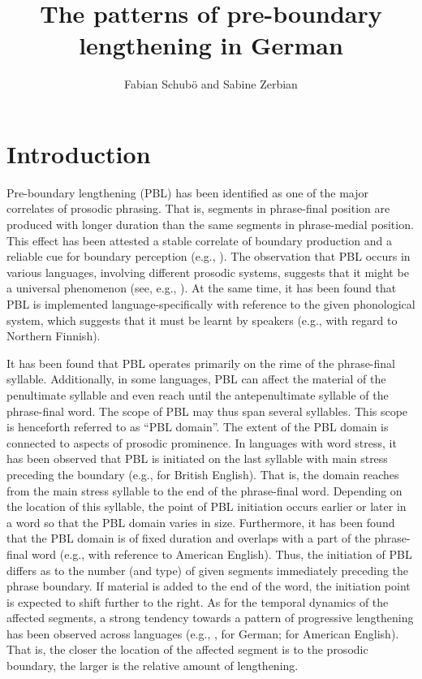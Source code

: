 \documentclass[output=paper]{langscibook}
\author{Fabian Schubö\orcid{0000-0002-9956-2438}\affiliation{University of Stuttgart} 
and Sabine Zerbian\orcid{0000-0002-4631-369X}\affiliation{University of Stuttgart}}
\title[Pre-boundary lengthening in German]{The patterns of pre-boundary lengthening in German}
\begin{document}
\maketitle

\section{Introduction}
Pre-boundary lengthening (PBL) has been identified as one of the major correlates of prosodic phrasing. That is, segments in phrase-final position are produced with longer duration than the same segments in phrase-medial position. This effect has been attested a stable correlate of boundary production and a reliable cue for boundary perception (e.g., \citealt{PetroneEtal2017}). The observation that PBL occurs in various languages, involving different prosodic systems, suggests that it might be a universal phenomenon (see, e.g., \citealt{Vaissiere83}). At the same time, it has been found that PBL is implemented language-specifically with reference to the given phonological system, which suggests that it must be learnt by speakers (e.g., \citealt{NakaiEtal2009} with regard to Northern Finnish).

It has been found that PBL operates primarily on the rime of the phrase-final syllable. Additionally, in some languages, PBL can affect the material of the penultimate syllable and even reach until the antepenultimate syllable of the phrase-final word. The scope of PBL may thus span several syllables. This scope is henceforth referred to as “PBL domain”. The extent of the PBL domain is connected to aspects of prosodic prominence. In languages with word stress, it has been observed that PBL is initiated on the last syllable with main stress preceding the boundary (e.g., \citealt{White2002} for British English). That is, the domain reaches from the main stress syllable to the end of the phrase-final word. Depending on the location of this syllable, the point of PBL initiation occurs earlier or later in a word so that the PBL domain varies in size. Furthermore, it has been found that the PBL domain is of fixed duration and overlaps with a part of the phrase-final word (e.g., \citealt{ByrdSaltzman2003} with reference to American English). Thus, the initiation of PBL differs as to the number (and type) of given segments immediately preceding the phrase boundary. If material is added to the end of the word, the initiation point is expected to shift further to the right. As for the temporal dynamics of the affected segments, a strong tendency towards a pattern of progressive lengthening has been observed across languages (e.g., \citealt{Kohler1983}, \citealt{Silverman1990} for German; \citealt{ByrdEtal2006} for American English). That is, the closer the location of the affected segment is to the prosodic boundary, the larger is the relative amount of lengthening. %
\end{document}
